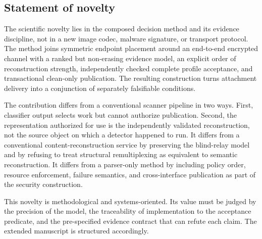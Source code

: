 \subsection{Statement of novelty}

The scientific novelty lies in the composed decision method and its evidence
discipline, not in a new image codec, malware signature, or transport protocol.
The method joins symmetric endpoint placement around an end-to-end encrypted
channel with a ranked but non-erasing evidence model, an explicit order of
reconstruction strength, independently checked complete profile acceptance,
and transactional clean-only publication. The resulting construction turns
attachment delivery into a conjunction of separately falsifiable conditions.

The contribution differs from a conventional scanner pipeline in two ways.
First, classifier output selects work but cannot authorize publication.
Second, the representation authorized for use is the independently validated
reconstruction, not the source object on which a detector happened to run. It
differs from a conventional content-reconstruction service by preserving the
blind-relay model and by refusing to treat structural remultiplexing as
equivalent to semantic reconstruction. It differs from a parser-only method by
including policy order, resource enforcement, failure semantics, and
cross-interface publication as part of the security construction.

This novelty is methodological and systems-oriented. Its value must be judged
by the precision of the model, the traceability of implementation to the
acceptance predicate, and the pre-specified evidence contract that can refute each
claim. The extended manuscript is structured accordingly.
